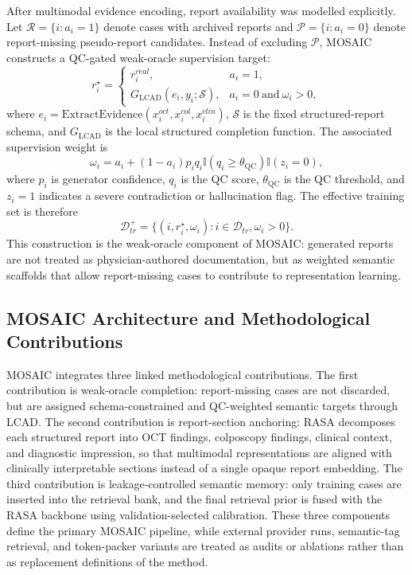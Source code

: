 \documentclass[11pt, a4paper]{article}
\theoremstyle{plain}
\theoremstyle{definition}
\begin{document}
After multimodal evidence encoding, report availability was modelled explicitly. Let \(\mathcal{R}=\{i:a_i=1\}\) denote cases with archived reports and \(\mathcal{P}=\{i:a_i=0\}\) denote report-missing pseudo-report candidates. Instead of excluding \(\mathcal{P}\), MOSAIC constructs a QC-gated weak-oracle supervision target:
\begin{equation}
r_i^{\star}
=
\begin{cases}
r_i^{real}, & a_i=1,\\
G_{\mathrm{LCAD}}(e_i,y_i;\mathcal{S}), & a_i=0\ \mathrm{and}\ \omega_i>0,
\end{cases}
\end{equation}
where \(e_i=\mathrm{ExtractEvidence}(x_i^{oct},x_i^{col},x_i^{clin})\), \(\mathcal{S}\) is the fixed structured-report schema, and \(G_{\mathrm{LCAD}}\) is the local structured completion function. The associated supervision weight is
\begin{equation}
\omega_i
=
a_i
+
(1-a_i)p_iq_i\mathbb{I}(q_i\geq\theta_{\mathrm{QC}})\mathbb{I}(z_i=0),
\end{equation}
where \(p_i\) is generator confidence, \(q_i\) is the QC score, \(\theta_{\mathrm{QC}}\) is the QC threshold, and \(z_i=1\) indicates a severe contradiction or hallucination flag. The effective training set is therefore
\begin{equation}
\mathcal{D}_{tr}^{+}=\{(i,r_i^{\star},\omega_i):i\in\mathcal{D}_{tr},\omega_i>0\}.
\end{equation}
This construction is the weak-oracle component of MOSAIC: generated reports are not treated as physician-authored documentation, but as weighted semantic scaffolds that allow report-missing cases to contribute to representation learning.

\subsection{MOSAIC Architecture and Methodological Contributions}
\label{subsec:methods_mosaic}

MOSAIC integrates three linked methodological contributions. The first contribution is weak-oracle completion: report-missing cases are not discarded, but are assigned schema-constrained and QC-weighted semantic targets through LCAD. The second contribution is report-section anchoring: RASA decomposes each structured report into OCT findings, colposcopy findings, clinical context, and diagnostic impression, so that multimodal representations are aligned with clinically interpretable sections instead of a single opaque report embedding. The third contribution is leakage-controlled semantic memory: only training cases are inserted into the retrieval bank, and the final retrieval prior is fused with the RASA backbone using validation-selected calibration. These three components define the primary MOSAIC pipeline, while external provider runs, semantic-tag retrieval, and token-packer variants are treated as audits or ablations rather than as replacement definitions of the method.
\end{document}
